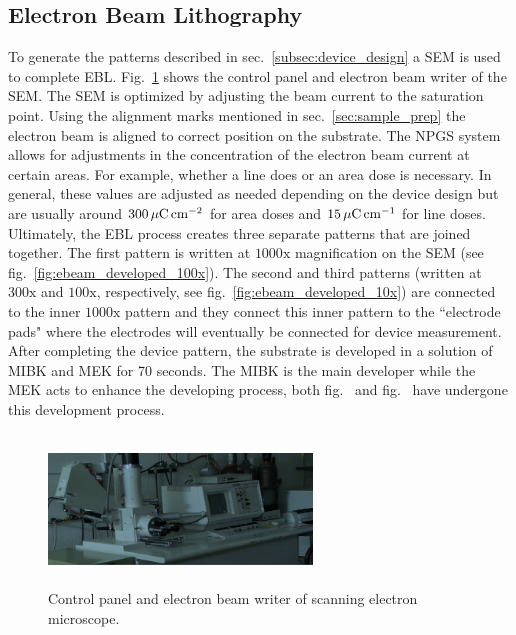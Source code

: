 \subsection{Electron Beam Lithography}\label{subsec:lithography}
To generate the patterns described in sec.~\ref{subsec:device_design} a \acs{SEM} is used to complete \acs{EBL}. Fig.~\ref{fig:SEM_machine} shows the control panel and electron beam writer of the \acs{SEM}. The \acs{SEM} is optimized by adjusting the beam current to the saturation point. Using the alignment marks mentioned in sec.~\ref{sec:sample_prep} the electron beam is aligned to correct position on the substrate. The \acs{NPGS} system allows for adjustments in the concentration of the electron beam current at certain areas. For example, whether a line does or an area dose is necessary. In general, these values are adjusted as needed depending on the device design but are usually around $300\,\mathrm{\mu C}\,\mathrm{cm}^{-2}$ for area doses and $15\,\mathrm{\mu C}\,\mathrm{cm}^{-1}$ for line doses. Ultimately, the \acs{EBL} process creates three separate patterns that are joined together. The first pattern is written at $1000\mathrm{x}$ magnification on the \acs{SEM} (see fig.~\ref{fig:ebeam_developed_100x}). The second and third patterns (written at $300\mathrm{x}$ and $100\mathrm{x}$, respectively, see fig.~\ref{fig:ebeam_developed_10x}) are connected to the inner $1000\mathrm{x}$ pattern and they connect this inner pattern to the ``electrode pads" where the electrodes will eventually be connected for device measurement. After completing the device pattern, the substrate is developed in a solution of \ac{MIBK} and \ac{MEK} for 70 seconds. The \acs{MIBK} is the main developer while the \acs{MEK} acts to enhance the developing process, both fig.~ and fig.~ have undergone this development process.
\begin{figure}[ht]
	\centering
	\includegraphics[height=4cm,width=7cm]{figs/experimental/SEM}
	\caption[Scanning electron microscope]{Control panel and electron beam writer of scanning electron microscope.}
	\label{fig:SEM_machine}
\end{figure}

